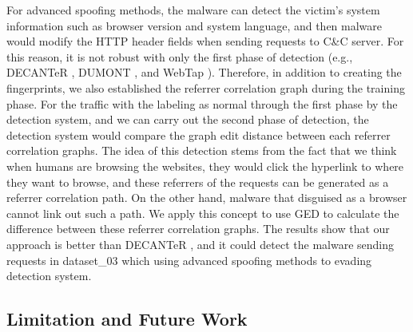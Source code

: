 For advanced spoofing methods, the malware can detect the victim's system information such as browser version and system language, and then malware would modify the HTTP header fields when sending requests to C\&C server. For this reason, it is not robust with only the first phase of detection (e.g., DECANTeR \cite{bortolameotti2017decanter}, DUMONT \cite{schwenk2011adaptive}, and WebTap \cite{borders2004web}). Therefore, in addition to creating the fingerprints, we also established the referrer correlation graph during the training phase. For the traffic with the labeling as normal through the first phase by the detection system, and we can carry out the second phase of detection, the detection system would compare the graph edit distance between each referrer correlation graphs. The idea of this detection stems from the fact that we think when humans are browsing the websites, they would click the hyperlink to where they want to browse, and these referrers of the requests can be generated as a referrer correlation path. On the other hand, malware that disguised as a browser cannot link out such a path. We apply this concept to use GED to calculate the difference between these referrer correlation graphs. The results show that our approach is better than DECANTeR \cite{bortolameotti2017decanter}, and it could detect the malware sending requests in dataset\_03 which using advanced spoofing methods to evading detection system.

\subsection{Limitation and Future Work}
